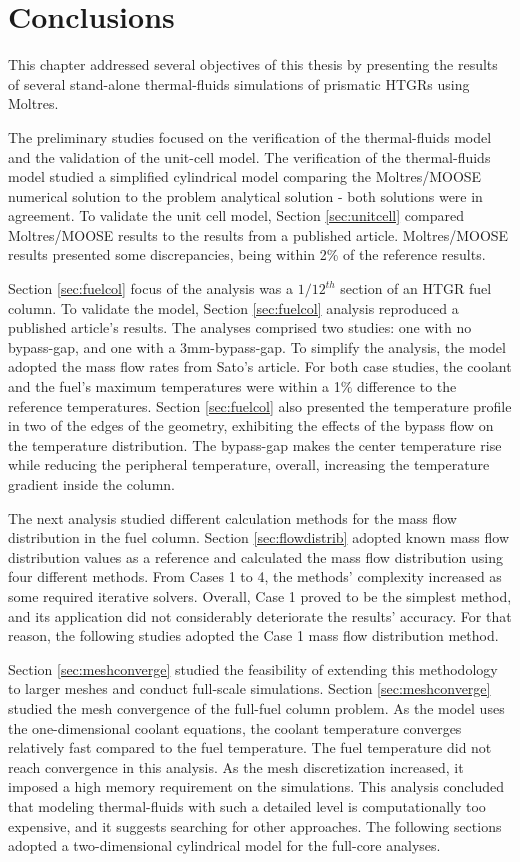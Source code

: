 \section{Conclusions}
\label{sec:thermal-conc}

This chapter addressed several objectives of this thesis by presenting the results of several stand-alone thermal-fluids simulations of prismatic HTGRs using Moltres.

The preliminary studies focused on the verification of the thermal-fluids model and the validation of the unit-cell model.
The verification of the thermal-fluids model studied a simplified cylindrical model comparing the Moltres/MOOSE numerical solution to the problem analytical solution - both solutions were in agreement.
To validate the unit cell model, Section \ref{sec:unitcell} compared Moltres/MOOSE results to the results from a published article.
Moltres/MOOSE results presented some discrepancies, being within 2\% of the reference results.

Section \ref{sec:fuelcol} focus of the analysis was a $1/12^{th}$ section of an HTGR fuel column.
To validate the model, Section \ref{sec:fuelcol} analysis reproduced a published article's results.
The analyses comprised two studies: one with no bypass-gap, and one with a 3mm-bypass-gap.
To simplify the analysis, the model adopted the mass flow rates from Sato's article.
For both case studies, the coolant and the fuel's maximum temperatures were within a 1\% difference to the reference temperatures.
Section \ref{sec:fuelcol} also presented the temperature profile in two of the edges of the geometry, exhibiting the effects of the bypass flow on the temperature distribution.
The bypass-gap makes the center temperature rise while reducing the peripheral temperature, overall, increasing the temperature gradient inside the column.

The next analysis studied different calculation methods for the mass flow distribution in the fuel column.
Section \ref{sec:flowdistrib} adopted known mass flow distribution values as a reference and calculated the mass flow distribution using four different methods.
From Cases 1 to 4, the methods' complexity increased as some required iterative solvers.
Overall, Case 1 proved to be the simplest method, and its application did not considerably deteriorate the results' accuracy.
For that reason, the following studies adopted the Case 1 mass flow distribution method.

Section \ref{sec:meshconverge} studied the feasibility of extending this methodology to larger meshes and conduct full-scale simulations.
Section \ref{sec:meshconverge} studied the mesh convergence of the full-fuel column problem.
As the model uses the one-dimensional coolant equations, the coolant temperature converges relatively fast compared to the fuel temperature.
The fuel temperature did not reach convergence in this analysis.
As the mesh discretization increased, it imposed a high memory requirement on the simulations.
This analysis concluded that modeling thermal-fluids with such a detailed level is computationally too expensive, and it suggests searching for other approaches.
The following sections adopted a two-dimensional cylindrical model for the full-core analyses.

